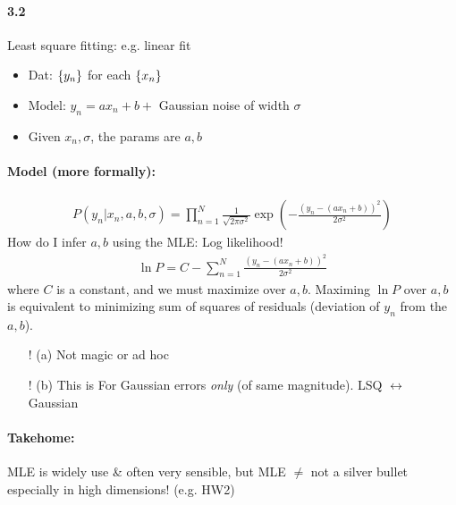 \documentclass[../main.tex]{subfiles}
\begin{document}
\paragraph{3.2} Least square fitting: e.g. linear fit
\begin{itemize}
    \item Dat: $\qt{y_n}$ for each $\qt{x_n}$
    \item Model: $y_n = a x_n + b +$ Gaussian noise of width $\sigma$
    \item Given $x_n, \sigma$, the params are $a, b$
\end{itemize}

\paragraph*{Model (more formally):}
\begin{align*}
    P(y_n | x_n, a, b, \sigma) = \prod_{n=1}^N \frac{1}{\sqrt{2\pi \sigma^2}}
    \exp(-\frac{(y_n - (a x_n + b))^2}{2\sigma^2})
\end{align*} 
How do I infer $a, b$ using the MLE: Log likelihood!
\begin{align*}
    \ln P = C - \sum_{n=1}^N \frac{(y_n - (a x_n + b))^2}{2\sigma^2}
\end{align*}
where $C$ is a constant, and we must maximize over $a, b$. Maximing $\ln P$ over $a, b$ is
equivalent to minimizing sum of squares of residuals (deviation of $y_n$ from the $a,b$). 

\begin{itemize}
    \item[!] (a) Not magic or ad hoc
    \item[!] (b) This is For Gaussian errors \emph{only} (of same magnitude).
    LSQ $\leftrightarrow$ Gaussian
\end{itemize}
\paragraph*{Takehome:} MLE is widely use \& often very sensible, but MLE $\neq$ not a silver bullet
especially in high dimensions! (e.g. HW2) 
\end{document}

